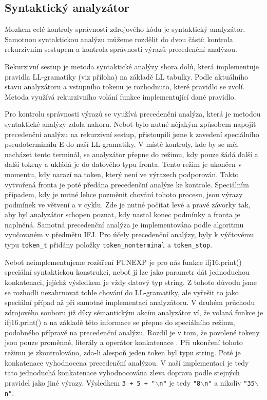 \documentclass[a4paper, 11pt]{article}
\begin{document}
    \subsection{Syntaktický analyzátor}
    Mozkem celé kontroly správnosti zdrojového kódu je syntaktický analyzátor. Samotnou syntaktickou analýzu můžeme rozdělit do dvou částí: kontrola rekurzivním sestupem a kontrola správnosti výrazů precedenční analýzou.\par
    Rekurzivní sestup je metoda syntaktické analýzy shora dolů, která implementuje pravidla LL-gramatiky (viz příloha) na základě LL tabulky. Podle aktuálního stavu analyzátoru a vstupního tokenu je rozhodnuto, které pravidlo se zvolí. Metoda využívá rekurzivního volání funkce implementující dané pravidlo.\par
    Pro kontrolu správnosti výrazů se využívá precedenční analýza, která je metodou syntaktické analýzy zdola nahoru. Neboť bylo nutné nějakým způsobem napojit precedenční analýzu na rekurzivní sestup, přistoupili jsme k zavedení speciálního pseudoterminálu E do naší LL-gramatiky. V místě kontroly, kde by se měl nacházet tento terminál, se analyzátor přepne do režimu, kdy pouze žádá další a další tokeny a ukládá je do datového typu fronta. Tento režim je ukončen v momentu, kdy narazí na token, který není ve výrazech podporován. Takto vytvořená fronta je poté předána precedenční analýze ke kontrole. Speciálním případem, kdy je nutné lehce pozměnit chování tohoto procesu, jsou výrazy podmínek ve větvení a v cyklu. Zde je nutné počítat levé a pravé závorky tak, aby byl analyzátor schopen poznat, kdy nastal konec podmínky a fronta je naplněná. Samotná precedenční analýza je implementována podle algoritmu vyučovaném v předmětu IFJ. Pro účely precedenční analýzy, byly k výčtovému typu \texttt{token\_t} přidány položky \texttt{token\_nonterminal} a \texttt{token\_stop}.\par
    Neboť neimplementujeme rozšíření FUNEXP je pro nás funkce ifj16.print() speciální syntaktickou konstrukcí, neboť jí lze jako parametr dát jednoduchou konkatenaci, jejíchž výsledkem je vždy datový typ string. Z tohoto důvodu jsme se rozhodli nezahrnovat tohle chování do LL-gramatiky, ale vyřešit to jako speciální případ až při samotné implementaci analyzátoru. V druhém průchodu zdrojového souboru již díky sémantickým akcím analyzátor ví, že volaná funkce je ifj16.print() a na základě této informace se přepne do speciálního režimu, podobného přípravě na precedenční analýzu. Rozdíl je v tom, že povolené tokeny jsou pouze proměnné, literály a operátor konkatenace \uv{+}. Při ukončení tohoto režimu je zkontrolováno, zda-li alespoň jeden token byl typu string. Poté je konkatenace vyhodnocena precedenční analýzou. V naší implementaci je tedy tato jednoduchá konkatenace vyhodnocována zleva doprava podle stejných pravidel jako jiné výrazy. Výsledkem \texttt{3 + 5 + "$\backslash$n"} je tedy \texttt{"8$\backslash$n"} a nikoliv \texttt{"35$\backslash$n"}.\par
\end{document}
